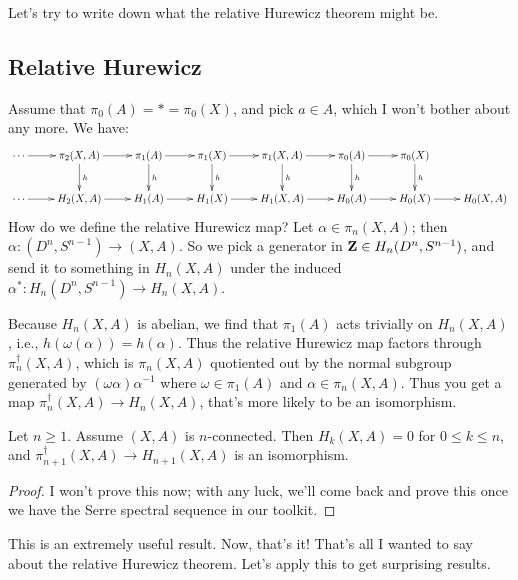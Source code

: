 Let's try to write down what the relative Hurewicz theorem might be.
\subsection{Relative Hurewicz}
    Assume that $\pi_0(A) = \ast = \pi_0(X)$, and pick $a\in A$, which I won't bother about any more. We have:
    \begin{equation*}
	\xymatrix{
	    \cdots\ar[r] & \pi_2(X,A)\ar[r]\ar[d]^h & \pi_1(A)\ar[r]\ar[d]^h & \pi_1(X)\ar[r]\ar[d]^h & \pi_1(X,A)\ar[r]\ar[d]^h & \pi_0(A)\ar[r]\ar[d]^h & \pi_0(X)\ar[d]^h & \\
	    \cdots\ar[r] & H_2(X,A)\ar[r] & H_1(A)\ar[r] & H_1(X)\ar[r] & H_1(X,A)\ar[r] & H_0(A)\ar[r] & H_0(X)\ar[r] & H_0(X,A)
	    }
    \end{equation*}
How do we define the relative Hurewicz map? Let $\alpha\in \pi_n(X,A)$; then $\alpha:(D^n,S^{n-1})\to (X,A)$. So we pick a generator in $\mathbf Z\in H_n(D^n,S^{n-1})$, and send it to something in $H_n(X,A)$ under the induced $\alpha^\ast:H_n(D^n,S^{n-1})\to H_n(X,A)$.

Because $H_n(X,A)$ is abelian, we find that $\pi_1(A)$ acts trivially on $H_n(X,A)$, i.e., $h(\omega(\alpha)) = h(\alpha)$. Thus the relative Hurewicz map factors through $\pi_n^\dagger(X,A)$, which is $\pi_n(X,A)$ quotiented out by the normal subgroup generated by $(\omega\alpha)\alpha^{-1}$ where $\omega\in\pi_1(A)$ and $\alpha\in \pi_n(X,A)$. Thus you get a map $\pi_n^\dagger(X,A)\to H_n(X,A)$, that's more likely to be an isomorphism.
\begin{theorem}
    Let $n\geq 1$. Assume $(X,A)$ is $n$-connected. Then $H_k(X,A) = 0$ for $0\leq k\leq n$, and $\pi_{n+1}^\dagger(X,A)\to H_{n+1}(X,A)$ is an isomorphism.
\end{theorem}
\begin{proof}
I won't prove this now; with any luck, we'll come back and prove this once we have the Serre spectral sequence in our toolkit.
\end{proof}
This is an extremely useful result. Now, that's it! That's all I wanted to say about the relative Hurewicz theorem. Let's apply this to get surprising results.
